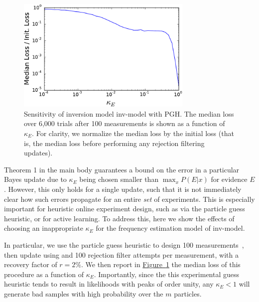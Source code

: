 \documentclass{article} %
\newcommand{\fig}[1]{\hyperref[fig:#1]{Figure~\ref*{fig:#1}}}
\begin{document}
\begin{figure}
    \begin{center}
        \includegraphics[width=0.75\textwidth]{kappa_E-failure-crop.pdf}
    \end{center}
    \caption{\label{fig:sensitivity-kappa}
        Sensitivity of inversion model {inv-model} with PGH. The median loss
        over 6,000 trials after 100 measurements is shown as a function of $\kappa_E$.
        For clarity, we normalize the median loss by the initial loss (that is, the median
        loss
        before performing any rejection filtering updates). 
    }
\end{figure}

Theorem 1 in the main body guarantees a bound on the error in a particular Bayes update due to
$\kappa_E$ being chosen smaller than $\max_x P(E|x)$ for evidence $E$.
However, this only holds for a single update, such that it is not immediately clear
how such errors propagate for an entire \emph{set} of experiments. This is especially
important for heuristic online experiment design, such as via the particle guess heuristic,
or for active learning. To address this, here we show the effects of choosing an inappropriate $\kappa_E$
for the frequency estimation model of {inv-model}. 

In particular,
we use the particle guess heuristic to design 100 measurements~\cite{wiebe_efficient_2015}, then update using
and 100 rejection filter attempts per measurement, with a recovery factor of
$r=2\%$. We then report in \fig{sensitivity-kappa} the median loss of this procedure as a function
of $\kappa_E$. Importantly, since the this experimental guess heuristic tends to result in likelihoods with
peaks of order unity, any $\kappa_E < 1$ will generate bad samples with high probability over the $m$ particles.
\end{document}
